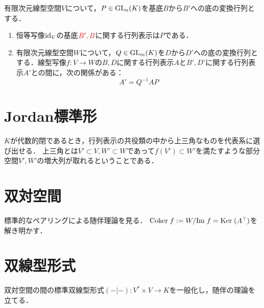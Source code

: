 \documentclass[uplatex,dvipdfmx]{jsreport}
\begin{document}
\begin{proposition}[底の変換行列の特徴づけ]\label{prop-transformation-matrix}
    有限次元線型空間$V$について，$P\in\mathrm{GL}_n(K)$を基底$B$から$B'$への底の変換行列とする．
    \begin{enumerate}
        \item 恒等写像$\mathrm{id}_V$の基底$\textcolor{red}{B',B}$に関する行列表示は$P$である．
        \item 有限次元線型空間$W$について，$Q\in\mathrm{GL}_m(K)$を$D$から$D'$への底の変換行列とする．線型写像$f:V\to W$の$B,D$に関する行列表示$A$と$B',D'$に関する行列表示$A'$との間に，次の関係がある：
        \[A'=Q^{-1}AP\]
    \end{enumerate}
\end{proposition}

\section{Jordan標準形}

\begin{tcolorbox}[colframe=ForestGreen, colback=ForestGreen!10!white,breakable,colbacktitle=ForestGreen!40!white,coltitle=black,fonttitle=\bfseries\sffamily,
title=]
    $K$が代数的閉であるとき，行列表示の共役類の中から上三角なものを代表系に選び出せる．
    上三角とは$V'\subset V,W'\subset W$であって$f(V')\subset W'$を満たすような部分空間$V',W'$の増大列が取れるということである．
\end{tcolorbox}

\section{双対空間}

\begin{tcolorbox}[colframe=ForestGreen, colback=ForestGreen!10!white,breakable,colbacktitle=ForestGreen!40!white,coltitle=black,fonttitle=\bfseries\sffamily,
title=]
    標準的なペアリングによる随伴理論を見る．
    $\mathrm{Coker}\; f:=W/\mathrm{Im}\; f=\mathrm{Ker}\;(A^\top)$を解き明かす．
\end{tcolorbox}

\section{双線型形式}

\begin{tcolorbox}[colframe=ForestGreen, colback=ForestGreen!10!white,breakable,colbacktitle=ForestGreen!40!white,coltitle=black,fonttitle=\bfseries\sffamily,
title=]
    双対空間の間の標準双線型形式$(-|-):V^*\times V\to K$を一般化し，随伴の理論を立てる．
\end{tcolorbox}
\end{document}
